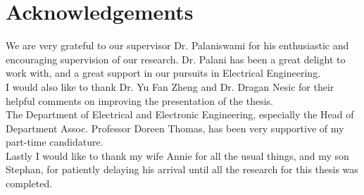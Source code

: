 \chapter*{Acknowledgements}


We are very  grateful  to our supervisor Dr. Palaniswami for  his
enthusiastic  and  encouraging   supervision of our  research. Dr. Palani  has  been a  
great   delight to  work  with, and  a great  support  in our pursuits in  Electrical Engineering. \\

I  would  also  like to thank Dr. Yu Fan Zheng and Dr. Dragan  Nesic for their helpful comments  on improving the presentation of the  thesis. \\

The Department of Electrical  and  Electronic Engineering, especially the  Head of Department 
Assoc. Professor Doreen Thomas,  has  been very supportive  of my part-time  candidature. \\

Lastly I  would like to thank  my  wife  Annie  for  all  the  usual  things, and my  son Stephan,  for  patiently   delaying his  arrival  until  all the  research   for this thesis  was  completed. 